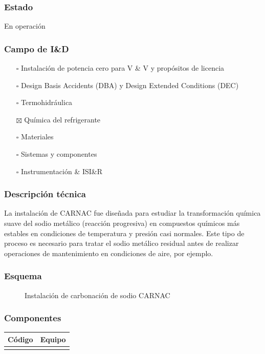 \documentclass{article}
\begin{document}
\subsubsection*{Estado}
En operación

\subsubsection*{Campo de I\&D}
\begin{itemize}
\item[$\square$] Instalación de potencia cero para V \& V y propósitos de licencia
\item[$\square$] Design Basis Accidents (DBA) y Design Extended Conditions (DEC)
\item[$\square$] Termohidráulica
\item[$\boxtimes$] Química del refrigerante
\item[$\square$] Materiales
\item[$\square$] Sistemas y componentes
\item[$\square$] Instrumentación \& ISI\&R
\end{itemize}
\subsubsection*{Descripción técnica}
La instalación de CARNAC fue diseñada para estudiar la transformación química suave del sodio metálico (reacción progresiva) en compuestos químicos más estables en condiciones de temperatura y presión casi normales. Este tipo de proceso es necesario para tratar el sodio metálico residual antes de realizar operaciones de mantenimiento en condiciones de aire, por ejemplo.
\subsubsection*{Esquema}
\begin{figure}[H]
\begin{center}
\end{center}
\caption{Instalación de carbonación de sodio CARNAC}
\end{figure}
\subsubsection*{Componentes}
\begin{table}[H]
\centering
\begin{tabular}{cp{4cm}}
\toprule
Código & Equipo \\
\midrule
\\
\bottomrule
\end{tabular}
\end{table}
\end{document}
